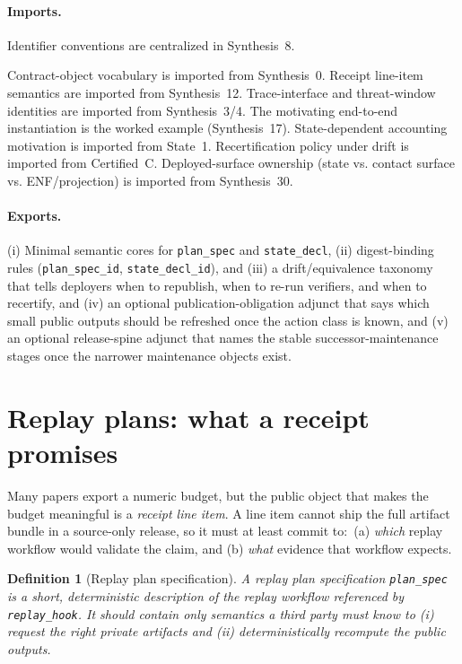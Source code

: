 \documentclass[11pt]{article}
\newtheorem{definition}{Definition}
\begin{document}
\paragraph{Imports.}
Identifier conventions are centralized in Synthesis~8.\cite{series:notation}

Contract-object vocabulary is imported from Synthesis~0.\cite{series:contractobjects}
Receipt line-item semantics are imported from Synthesis~12.\cite{series:receiptitems}
Trace-interface and threat-window identities are imported from Synthesis~3/4.\cite{series:traceifaces,series:threatwindows}
The motivating end-to-end instantiation is the worked example (Synthesis~17).\cite{series:workedexample}
State-dependent accounting motivation is imported from State~1.\cite{series:state1}
Recertification policy under drift is imported from Certified~C.\cite{series:recert}
Deployed-surface ownership (state vs. contact surface vs. ENF/projection) is imported from Synthesis~30.\cite{series:deployedsurfaces}

\paragraph{Exports.}
(i) Minimal semantic cores for \texttt{plan\_spec} and \texttt{state\_decl},
(ii) digest-binding rules (\texttt{plan\_spec\_id}, \texttt{state\_decl\_id}), and
(iii) a drift/equivalence taxonomy that tells deployers when to republish, when to re-run verifiers, and when to recertify, and (iv) an optional publication-obligation adjunct that says which small public outputs should be refreshed once the action class is known, and (v) an optional release-spine adjunct that names the stable successor-maintenance stages once the narrower maintenance objects exist.

\section{Replay plans: what a receipt promises}
Many papers export a numeric budget, but the public object that makes the budget meaningful is a \emph{receipt line item}.\cite{series:receiptitems}
A line item cannot ship the full artifact bundle in a source-only release, so it must at least commit to:\
(a) \emph{which} replay workflow would validate the claim, and
(b) \emph{what} evidence that workflow expects.

\begin{definition}[Replay plan specification]
A \emph{replay plan specification} \texttt{plan\_spec} is a short, deterministic description of the replay workflow referenced by \texttt{replay\_hook}.
It should contain only semantics a third party must know to (i) request the right private artifacts and (ii) deterministically recompute the public outputs.
\end{definition}
\end{document}
